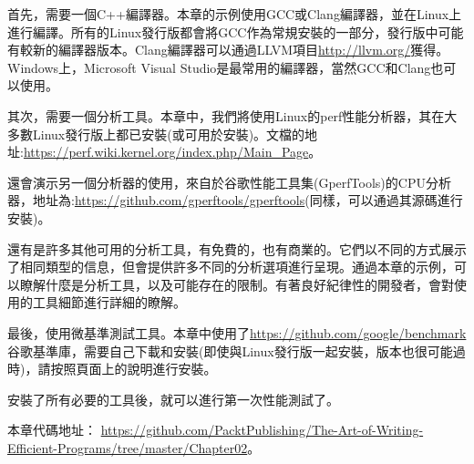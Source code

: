 首先，需要一個C++編譯器。本章的示例使用GCC或Clang編譯器，並在Linux上進行編譯。所有的Linux發行版都會將GCC作為常規安裝的一部分，發行版中可能有較新的編譯器版本。Clang編譯器可以通過LLVM項目\url{http://llvm.org/}獲得。Windows上，Microsoft Visual Studio是最常用的編譯器，當然GCC和Clang也可以使用。

其次，需要一個分析工具。本章中，我們將使用Linux的perf性能分析器，其在大多數Linux發行版上都已安裝(或可用於安裝)。文檔的地址:\url{https://perf.wiki.kernel.org/index.php/Main_Page}。

還會演示另一個分析器的使用，來自於谷歌性能工具集(GperfTools)的CPU分析器，地址為:\url{https://github.com/gperftools/gperftools}(同樣，可以通過其源碼進行安裝)。

還有是許多其他可用的分析工具，有免費的，也有商業的。它們以不同的方式展示了相同類型的信息，但會提供許多不同的分析選項進行呈現。通過本章的示例，可以瞭解什麼是分析工具，以及可能存在的限制。有著良好紀律性的開發者，會對使用的工具細節進行詳細的瞭解。

最後，使用微基準測試工具。本章中使用了\url{https://github.com/google/benchmark}谷歌基準庫，需要自己下載和安裝(即使與Linux發行版一起安裝，版本也很可能過時)，請按照頁面上的說明進行安裝。

安裝了所有必要的工具後，就可以進行第一次性能測試了。

本章代碼地址： \url{https://github.com/PacktPublishing/The-Art-of-Writing-Efficient-Programs/tree/master/Chapter02}。



